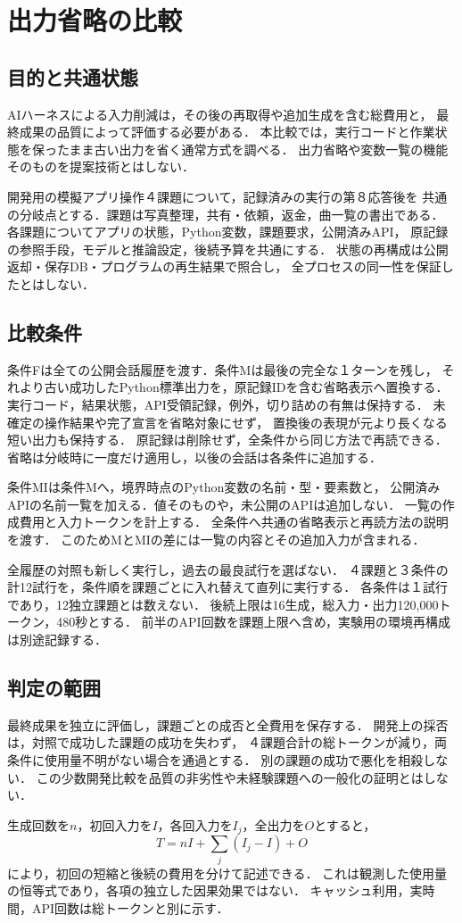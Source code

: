 \section{出力省略の比較}
\subsection{目的と共通状態}
AIハーネスによる入力削減は，その後の再取得や追加生成を含む総費用と，
最終成果の品質によって評価する必要がある．
本比較では，実行コードと作業状態を保ったまま古い出力を省く通常方式を調べる．
出力省略や変数一覧の機能そのものを提案技術とはしない．

開発用の模擬アプリ操作４課題について，記録済みの実行の第８応答後を
共通の分岐点とする．課題は写真整理，共有・依頼，返金，曲一覧の書出である．
各課題についてアプリの状態，Python変数，課題要求，公開済みAPI，
原記録の参照手段，モデルと推論設定，後続予算を共通にする．
状態の再構成は公開返却・保存DB・プログラムの再生結果で照合し，
全プロセスの同一性を保証したとはしない．

\subsection{比較条件}
条件Fは全ての公開会話履歴を渡す．条件Mは最後の完全な１ターンを残し，
それより古い成功したPython標準出力を，原記録IDを含む省略表示へ置換する．
実行コード，結果状態，API受領記録，例外，切り詰めの有無は保持する．
未確定の操作結果や完了宣言を省略対象にせず，
置換後の表現が元より長くなる短い出力も保持する．
原記録は削除せず，全条件から同じ方法で再読できる．
省略は分岐時に一度だけ適用し，以後の会話は各条件に追加する．

条件MIは条件Mへ，境界時点のPython変数の名前・型・要素数と，
公開済みAPIの名前一覧を加える．値そのものや，未公開のAPIは追加しない．
一覧の作成費用と入力トークンを計上する．
全条件へ共通の省略表示と再読方法の説明を渡す．
このためMとMIの差には一覧の内容とその追加入力が含まれる．

全履歴の対照も新しく実行し，過去の最良試行を選ばない．
４課題と３条件の計12試行を，条件順を課題ごとに入れ替えて直列に実行する．
各条件は１試行であり，12独立課題とは数えない．
後続上限は16生成，総入力・出力120,000トークン，480秒とする．
前半のAPI回数を課題上限へ含め，実験用の環境再構成は別途記録する．

\subsection{判定の範囲}
最終成果を独立に評価し，課題ごとの成否と全費用を保存する．
開発上の採否は，対照で成功した課題の成功を失わず，
４課題合計の総トークンが減り，両条件に使用量不明がない場合を通過とする．
別の課題の成功で悪化を相殺しない．
この少数開発比較を品質の非劣性や未経験課題への一般化の証明とはしない．

生成回数を$n$，初回入力を$I$，各回入力を$I_j$，全出力を$O$とすると，
\begin{equation}
 T=nI+\sum_j(I_j-I)+O
\end{equation}
により，初回の短縮と後続の費用を分けて記述できる．
これは観測した使用量の恒等式であり，各項の独立した因果効果ではない．
キャッシュ利用，実時間，API回数は総トークンと別に示す．
